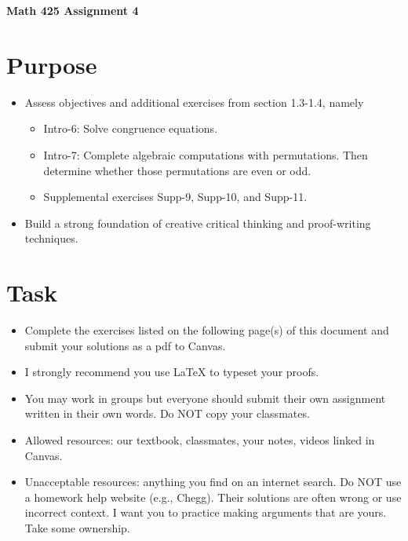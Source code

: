 \documentclass[12pt]{article}
\begin{document}
	\begin{center}
		{\Large \bf Math 425 Assignment 4}
	\end{center}
	\section*{Purpose}
		\begin{itemize}
			\item Assess objectives and additional exercises from section 1.3-1.4, namely
				\begin{itemize}
					\item Intro-6: Solve congruence equations.
					\item Intro-7: Complete algebraic computations with permutations. Then determine whether those permutations are even or odd.
					\item Supplemental exercises Supp-9, Supp-10, and Supp-11. 
				\end{itemize}
			\item Build a strong foundation of creative critical thinking and proof-writing techniques.
		\end{itemize}
	\section*{Task}
		\begin{itemize}
			\item Complete the exercises listed on the following page(s) of this document and submit your solutions as a pdf to Canvas.
			\item I strongly recommend you use LaTeX to typeset your proofs.
			\item You may work in groups but everyone should submit their own assignment written in their own words.  Do NOT copy your classmates.
			\item Allowed resources: our textbook, classmates, your notes, videos linked in Canvas.
			\item Unacceptable resources: anything you find on an internet search. Do NOT use a homework help website (e.g., Chegg). Their solutions are often wrong or use incorrect context.  I want you to practice making arguments that are yours. Take some ownership.
		\end{itemize}
\end{document}
